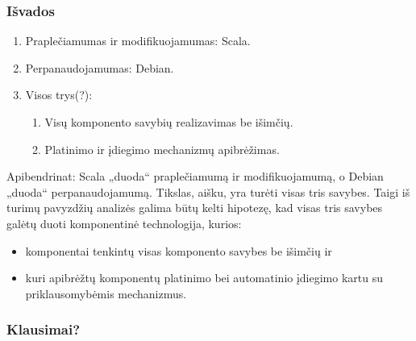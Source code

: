 \begin{frame}
  \frametitle{Išvados}
  \begin{enumerate}
    \item Praplečiamumas ir modifikuojamumas: Scala.
    \item Perpanaudojamumas: Debian.
    \item Visos trys(?):
      \begin{enumerate}
        \item Visų komponento savybių realizavimas be išimčių.
        \item Platinimo ir įdiegimo mechanizmų apibrėžimas.
      \end{enumerate}
  \end{enumerate}
  \begin{handout}
    Apibendrinat: Scala „duoda“ praplečiamumą ir modifikuojamumą, o
    Debian „duoda“ perpanaudojamumą. Tikslas, aišku, yra turėti
    visas tris savybes. Taigi iš turimų pavyzdžių analizės galima
    būtų kelti hipotezę, kad visas tris savybes galėtų duoti komponentinė
    technologija, kurios:
    \begin{itemize}
      \item komponentai tenkintų visas komponento savybes be išimčių ir
      \item kuri apibrėžtų komponentų platinimo bei automatinio
        įdiegimo kartu su priklausomybėmis mechanizmus.
    \end{itemize}
  \end{handout}
\end{frame}

\begin{frame}
  \frametitle{Klausimai?}
\end{frame}
